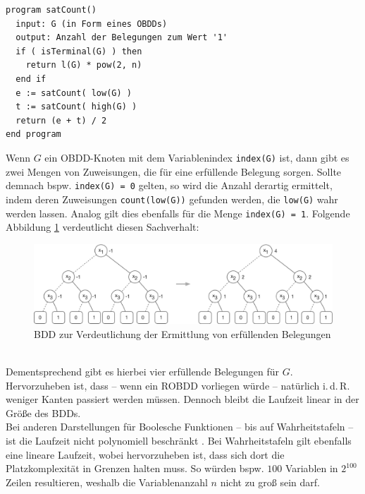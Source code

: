 \lstset{language=xml}
\begin{lstlisting}[frame=htrbl, caption={Implementierung von {\ttfamily satCount}}, label={lst:satcount}]
program satCount()
  input: G (in Form eines OBDDs)
  output: Anzahl der Belegungen zum Wert '1'
  if ( isTerminal(G) ) then 
    return l(G) * pow(2, n)
  end if
  e := satCount( low(G) )
  t := satCount( high(G) )
  return (e + t) / 2
end program
\end{lstlisting}
Wenn $G$ ein OBDD-Knoten mit dem Variablenindex \texttt{index(G)} ist, dann gibt es zwei Mengen von Zuweisungen, die für eine erfüllende Belegung sorgen. Sollte demnach bspw. \texttt{index(G) = 0} gelten, so wird die Anzahl derartig ermittelt, indem deren Zuweisungen \texttt{count(low(G))} gefunden werden, die \texttt{low(G)} wahr werden lassen. Analog gilt dies ebenfalls für die Menge \texttt{index(G) = 1}. Folgende Abbildung \ref{fig:satcount} verdeutlicht diesen Sachverhalt:
\begin{figure}[bth]
	\centering
	\includegraphics[scale=0.3]{./img/satcount}
	\caption[BDD zur Verdeutlichung der Ermittlung von erfüllenden Belegungen]{BDD zur Verdeutlichung der Ermittlung von erfüllenden Belegungen}
	\label{fig:satcount}
\end{figure}\\
\noindent
Dementsprechend gibt es hierbei vier erfüllende Belegungen für $G$. Hervorzuheben ist, dass -- wenn ein ROBDD vorliegen würde -- natürlich i.\,d.\,R. weniger Kanten passiert werden müssen. Dennoch bleibt die Laufzeit linear in der Größe des BDDs.\\
Bei anderen Darstellungen für Boolesche Funktionen -- bis auf Wahrheitstafeln -- ist die Laufzeit nicht polynomiell beschränkt \cite{m2007}. Bei Wahrheitstafeln gilt ebenfalls eine lineare Laufzeit, wobei hervorzuheben ist, dass sich dort die Platzkomplexität in Grenzen halten muss. So würden bspw. $100$ Variablen in $2^{100}$ Zeilen resultieren, weshalb die Variablenanzahl $n$ nicht zu groß sein darf.
